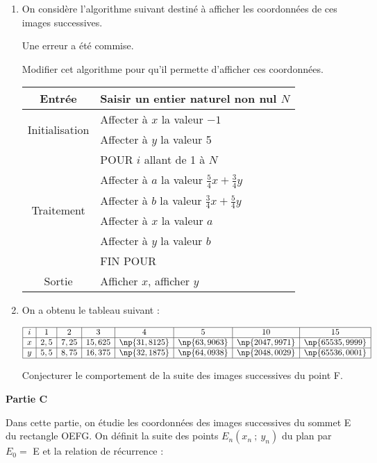 \documentclass[10pt]{article}
\begin{document}
\medskip
 
\begin{enumerate}
\item On considère l'algorithme suivant destiné à afficher les coordonnées de ces images successives.
 
Une erreur a été commise.
 
Modifier cet algorithme pour qu'il permette d'afficher ces coordonnées.

\begin{center}
\begin{tabular}{|c|l|}\hline 
Entrée &Saisir un entier naturel non nul $N$\\ \hline 
\multirow{2}{2cm}{Initialisation }&Affecter à $x$ la valeur $- 1$\\ 
&Affecter à $y$ la valeur 5\\ \hline 
\multirow{6}{2cm}{Traitement}&POUR $i$ allant de 1 à $N$\\ 
&Affecter à $a$ la valeur $\frac{5}{4} x + \frac{3}{4}y$\\ 
&Affecter à $b$ la valeur $\frac{3}{4}x + \frac{5}{4}y$\\ 
&Affecter à $x$ la valeur $a$\\ 
&Affecter à $y$ la valeur $b$\\ 
&FIN POUR\\ \hline 
Sortie &Afficher $x$, afficher $y$\\ \hline
\end{tabular}
\end{center} 

\item On a obtenu le tableau suivant :

\[\begin{array}{|*{8}{c|}} \hline
i &1 &2 &3 &4 &5 &10 &15\\ \hline 
x &2,5 &7,25 &15,625 &\np{31,8125} &\np{63,9063} &\np{2047,9971} &\np{65535,9999}\\ \hline 
y &5,5 &8,75 &16,375 &\np{32,1875} &\np{64,0938} &\np{2048,0029} &\np{65536,0001}\\ \hline
\end{array}\]
 
Conjecturer le comportement de la suite des images successives du point F. 
\end{enumerate}

\bigskip
 
\textbf{Partie C}

\medskip

Dans cette partie, on étudie les coordonnées des images successives du sommet E du rectangle OEFG. On définit la suite des points $E_{n}\left(x_{n}~;~y_{n}\right)$ du plan par $E_{0} =$ E et la relation de récurrence :
\end{document}

